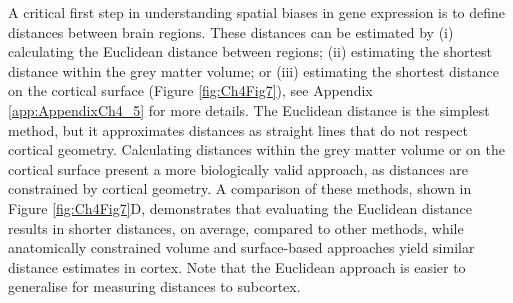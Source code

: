 A critical first step in understanding spatial biases in gene expression is to define distances between brain regions. These distances can be estimated by (i) calculating the Euclidean distance between regions; (ii) estimating the shortest distance within the grey matter volume; or (iii) estimating the shortest distance on the cortical surface (Figure \ref{fig:Ch4Fig7}), see Appendix \ref{app:AppendixCh4_5} for more details. The Euclidean distance is the simplest method, but it approximates distances as straight lines that do not respect cortical geometry. Calculating distances within the grey matter volume or on the cortical surface present a more biologically valid approach, as distances are constrained by cortical geometry. A comparison of these methods, shown in Figure \ref{fig:Ch4Fig7}D, demonstrates that evaluating the Euclidean distance results in shorter distances, on average, compared to other methods, while anatomically constrained volume and surface-based approaches yield similar distance estimates in cortex. Note that the Euclidean approach is easier to generalise for measuring distances to subcortex.

